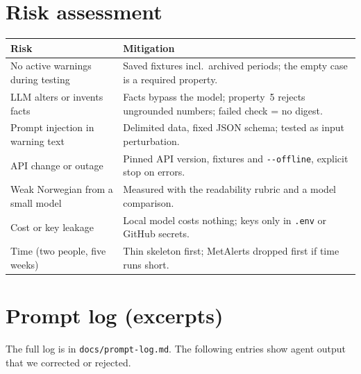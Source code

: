 \documentclass{article}
\newcommand{\code}[1]{\texttt{#1}}
\begin{document}
\section{Risk assessment}

\begin{table}[H]
\centering
\small
\begin{tabularx}{\textwidth}{@{}>{\raggedright\arraybackslash}p{4.2cm}X@{}}
\toprule
\textbf{Risk} & \textbf{Mitigation} \\
\midrule
No active warnings during testing & Saved fixtures incl.\ archived periods; the empty case is a required property. \\
LLM alters or invents facts & Facts bypass the model; property~5 rejects ungrounded numbers; failed check = no digest. \\
Prompt injection in warning text & Delimited data, fixed JSON schema; tested as input perturbation. \\
API change or outage & Pinned API version, fixtures and \code{-{}-offline}, explicit stop on errors. \\
Weak Norwegian from a small model & Measured with the readability rubric and a model comparison. \\
Cost or key leakage & Local model costs nothing; keys only in \code{.env} or GitHub secrets. \\
Time (two people, five weeks) & Thin skeleton first; MetAlerts dropped first if time runs short. \\
\bottomrule
\end{tabularx}
\end{table}

\newpage
\appendix

\section{Prompt log (excerpts)}

The full log is in \code{docs/prompt-log.md}. The following entries show agent output that we corrected or rejected.
\end{document}
